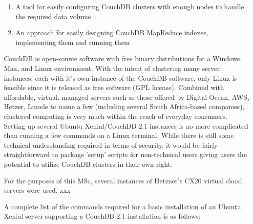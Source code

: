 \begin{enumerate}
    \item A tool for easily configuring CouchDB clusters with enough nodes to handle the required data volume
    \item An approach for easily designing CouchDB MapReduce indexes, implementing them and running them
\end{enumerate}

CouchDB is open-source software with free binary distributions for a Windows, Max, and Linux environment. With the intent of clustering many server instances, each with it's own instance of the CouchDB software, only Linux is feasible since it is released as free software (GPL license). Combined with affordable, virtual, managed servers such as those offered by Digital Ocean, AWS, Hetzer, Linode to name a few (including several South Africa-based companies), clustered computing is very much within the reach of everyday consumers. Setting up several Ubuntu Xenial/CouchDB 2.1 instances is no more complicated than running a few commands on a Linux terminal. While there is still some technical understanding required in terms of security, it would be fairly straightforward to package 'setup' scripts for non-technical users giving users the potential to utilize CouchDB clusters in their own right.

For the purposes of this MSc, several instances of Hetzner's CX20 virtual cloud servers were used. xxx

A complete list of the commands required for a basic installation of an Ubuntu Xenial server supporting a CouchDB 2.1 installation is as follows:

